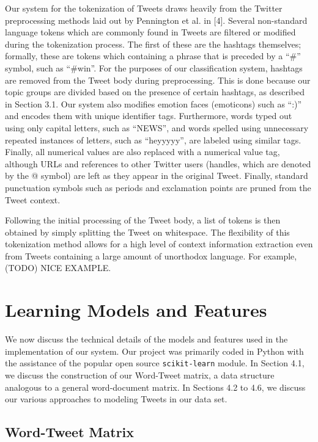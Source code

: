 \documentclass[11pt]{article}
\begin{document}
Our system for the tokenization of Tweets draws heavily from the Twitter preprocessing methods laid out by Pennington et al. in [4]. Several non-standard language tokens which are commonly found in Tweets are filtered or modified during the tokenization process. The first of these are the hashtags themselves; formally, these are tokens which containing a phrase that is preceded by a “\#” symbol, such as ``\#win''. For the purposes of our classification system, hashtags are removed from the Tweet body during preprocessing. This is done because our topic groups are divided based on the presence of certain hashtags, as described in Section 3.1.  Our system also modifies emotion faces (emoticons) such as ``:)'' and encodes them with unique identifier tags. Furthermore, words typed out using only capital letters, such as ``NEWS'', and words spelled using unnecessary repeated instances of letters, such as ``heyyyyy'', are labeled using similar tags. Finally, all numerical values are also replaced with a numerical value tag, although URLs and references to other Twitter users (handles, which are denoted by the @ symbol) are left as they appear in the original Tweet. Finally, standard punctuation symbols such as periods and exclamation points are pruned from the Tweet context.

Following the initial processing of the Tweet body, a list of tokens is then obtained by simply splitting the Tweet on whitespace. The flexibility of this tokenization method allows for a high level of context information extraction even from Tweets containing a large amount of unorthodox language. For example, (TODO) NICE EXAMPLE.

\section{Learning Models and Features}

We now discuss the technical details of the models and features used in the implementation of our system. Our project was primarily coded in Python with the assistance of the popular open source \texttt{scikit-learn} module. In Section 4.1, we discuss the construction of our Word-Tweet matrix, a data structure analogous to a general word-document matrix. In Sections 4.2 to 4.6, we discuss our various approaches to modeling Tweets in our data set.

\subsection{Word-Tweet Matrix}
\end{document}
